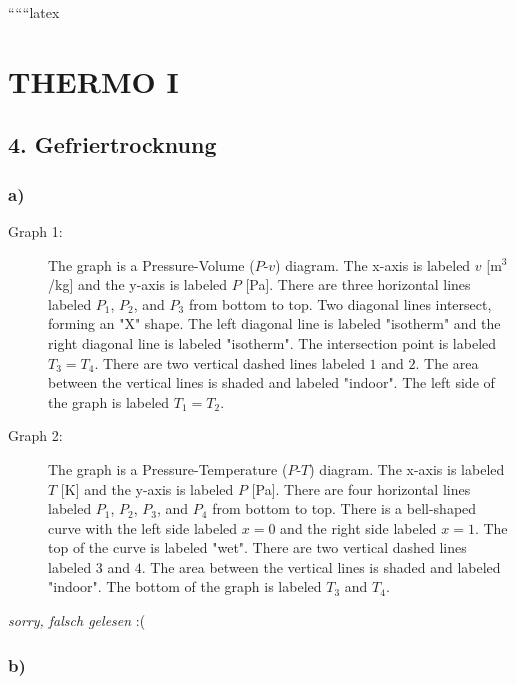 
``````latex


\section*{THERMO I}

\subsection*{4. Gefriertrocknung}

\subsubsection*{a)}

\begin{description}
    \item[Graph 1:] The graph is a Pressure-Volume ($P$-$v$) diagram. The x-axis is labeled $v$ [m$^3$/kg] and the y-axis is labeled $P$ [Pa]. There are three horizontal lines labeled $P_1$, $P_2$, and $P_3$ from bottom to top. Two diagonal lines intersect, forming an "X" shape. The left diagonal line is labeled "isotherm" and the right diagonal line is labeled "isotherm". The intersection point is labeled $T_3 = T_4$. There are two vertical dashed lines labeled $1$ and $2$. The area between the vertical lines is shaded and labeled "indoor". The left side of the graph is labeled $T_1 = T_2$.
\end{description}

\begin{description}
    \item[Graph 2:] The graph is a Pressure-Temperature ($P$-$T$) diagram. The x-axis is labeled $T$ [K] and the y-axis is labeled $P$ [Pa]. There are four horizontal lines labeled $P_1$, $P_2$, $P_3$, and $P_4$ from bottom to top. There is a bell-shaped curve with the left side labeled $x = 0$ and the right side labeled $x = 1$. The top of the curve is labeled "wet". There are two vertical dashed lines labeled $3$ and $4$. The area between the vertical lines is shaded and labeled "indoor". The bottom of the graph is labeled $T_3$ and $T_4$.
\end{description}

\textit{sorry, falsch gelesen} :(

\subsubsection*{b)}

